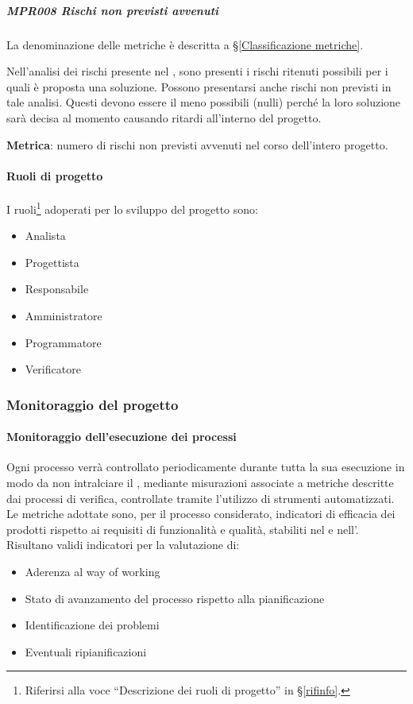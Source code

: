             \subparagraph{MPR008 Rischi non previsti avvenuti}
            La denominazione delle metriche è descritta a \S\ref{Classificazione metriche}.


            Nell'analisi dei rischi presente nel \PdPd, sono presenti i rischi ritenuti possibili per i quali è proposta una soluzione.
            Possono presentarsi anche rischi non previsti in tale analisi. Questi devono essere il meno possibili (nulli) perché la loro soluzione sarà decisa al momento causando ritardi all'interno del progetto.

            \textbf{Metrica}: numero di rischi non previsti avvenuti nel corso dell'intero progetto.

			\paragraph{Ruoli di progetto}
			I ruoli\footnote{Riferirsi alla voce ``Descrizione dei ruoli di progetto'' in \S\ref{rifinfo}.} adoperati per lo sviluppo del progetto sono:
			\begin{itemize}[noitemsep]
				\item Analista
				\item Progettista
				\item Responsabile
				\item Amministratore
				\item Programmatore
				\item Verificatore
			\end{itemize}


			\subsubsection{Monitoraggio del progetto}

			\paragraph{Monitoraggio dell'esecuzione dei processi}
			Ogni processo verrà controllato periodicamente durante tutta la sua esecuzione in modo da non intralciare il ,
			mediante misurazioni associate a metriche descritte dai processi di verifica, controllate tramite l'utilizzo di strumenti automatizzati.
			Le metriche adottate sono, per il processo considerato, indicatori di efficacia dei prodotti rispetto ai requisiti di funzionalità e qualità,
			stabiliti nel \Doc{\PdQv} e nell'\Doc{\AdRv}.\\
			Risultano validi indicatori per la valutazione di:
			\begin{itemize}
				\item Aderenza al way of working
				\item Stato di avanzamento del processo rispetto alla pianificazione
				\item Identificazione dei problemi
				\item Eventuali ripianificazioni
			\end{itemize}

